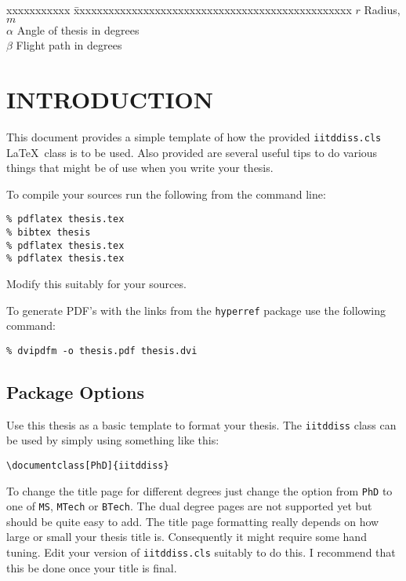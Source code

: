 \documentclass[Other]{iitddiss}
\begin{document}
\begin{singlespace}
\begin{tabbing}
xxxxxxxxxxx \= xxxxxxxxxxxxxxxxxxxxxxxxxxxxxxxxxxxxxxxxxxxxxxxx \kill
\textbf{$r$}  \> Radius, $m$ \\
\textbf{$\alpha$}  \> Angle of thesis in degrees \\
\textbf{$\beta$}   \> Flight path in degrees \\
\end{tabbing}
\end{singlespace}

\pagebreak
\clearpage




\chapter{INTRODUCTION}
\label{chap:intro}

This document provides a simple template of how the provided
\verb+iitddiss.cls+ \LaTeX\ class is to be used.  Also provided are
several useful tips to do various things that might be of use when you
write your thesis.

To compile your sources run the following from the command line:
\begin{verbatim}
% pdflatex thesis.tex
% bibtex thesis
% pdflatex thesis.tex
% pdflatex thesis.tex
\end{verbatim}
Modify this suitably for your sources.

To generate PDF's with the links from the \verb+hyperref+ package use
the following command:
\begin{verbatim}
% dvipdfm -o thesis.pdf thesis.dvi
\end{verbatim}

\section{Package Options}

Use this thesis as a basic template to format your thesis.  The
\verb+iitddiss+ class can be used by simply using something like this:
\begin{verbatim}
\documentclass[PhD]{iitddiss}
\end{verbatim}

To change the title page for different degrees just change the option
from \verb+PhD+ to one of \verb+MS+, \verb+MTech+ or \verb+BTech+.
The dual degree pages are not supported yet but should be quite easy
to add.  The title page formatting really depends on how large or
small your thesis title is.  Consequently it might require some hand
tuning.  Edit your version of \verb+iitddiss.cls+ suitably to do this.
I recommend that this be done once your title is final.
\end{document}

